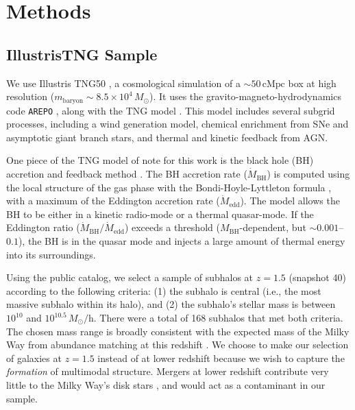 \documentclass[twocolumn]{aastex631}
\newcommand{\Msun}{\ensuremath{M_{\odot}}}
\begin{document}
\section{Methods}\label{sec:methods}
\subsection{IllustrisTNG Sample}\label{ssec:tng}
We use Illustris TNG50 \citep{2019MNRAS.490.3196P, 2019MNRAS.490.3234N}, a cosmological simulation of a $\sim50\,\textrm{cMpc}$ box at high resolution ($m_{\textrm{baryon}}\sim8.5\times10^4\,\Msun$). It uses the gravito-magneto-hydrodynamics code \texttt{AREPO} \citep{2010MNRAS.401..791S, 2016MNRAS.455.1134P}, along with the TNG model \citep{2013MNRAS.436.3031V, 2017MNRAS.465.3291W, 2018MNRAS.473.4077P}. This model includes several subgrid processes, including a wind generation model, chemical enrichment from SNe and asymptotic giant branch stars, and thermal and kinetic feedback from AGN.

One piece of the TNG model of note for this work is the black hole (BH) accretion and feedback method \citep{2017MNRAS.465.3291W}. The BH accretion rate ($\dot{M}_{\textrm{BH}}$) is computed using the local structure of the gas phase with the Bondi-Hoyle-Lyttleton formula \citep{1939PCPS...35..405H,1944MNRAS.104..273B,1952MNRAS.112..195B}, with a maximum of the Eddington accretion rate ($\dot{M}_{\textrm{edd}}$). The model allows the BH to be either in a kinetic radio-mode or a thermal quasar-mode. If the Eddington ratio ($\dot{M}_{\textrm{BH}}/\dot{M}_{\textrm{edd}}$) exceeds a threshold ($M_{\textrm{BH}}$-dependent, but $\sim0.001$--$0.1$), the BH is in the quasar mode and injects a large amount of thermal energy into its surroundings.

Using the public catalog, we select a sample of subhalos at $z=1.5$ (snapshot 40) according to the following criteria: (1) the subhalo is central (i.e., the most massive subhalo within its halo), and (2) the subhalo's stellar mass is between $10^{10}$ and $10^{10.5}\,\Msun/\textrm{h}$. There were a total of 168 subhalos that met both criteria. The chosen mass range is broadly consistent with the expected mass of the Milky Way from abundance matching at this redshift \citep{2013ApJ...771L..35V}. We choose to make our selection of galaxies at $z=1.5$ instead of at lower redshift because we wish to capture the \textit{formation} of multimodal structure. Mergers at lower redshift contribute very little to the Milky Way's disk stars \citep[e.g.,][]{2016ARA&A..54..529B}, and would act as a contaminant in our sample.
\end{document}

